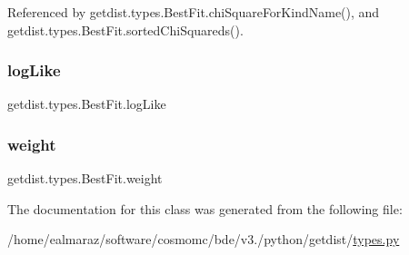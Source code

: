 Referenced by getdist.\+types.\+Best\+Fit.\+chi\+Square\+For\+Kind\+Name(), and getdist.\+types.\+Best\+Fit.\+sorted\+Chi\+Squareds().

\mbox{\label{classgetdist_1_1types_1_1BestFit_a28cc70877c8a1616051400ddbec10e52}} 
\subsubsection{\texorpdfstring{log\+Like}{logLike}}
{\footnotesize\ttfamily getdist.\+types.\+Best\+Fit.\+log\+Like}

\mbox{\label{classgetdist_1_1types_1_1BestFit_a55aeaf0af24610e27b143aa4f959e2ab}} 
\subsubsection{\texorpdfstring{weight}{weight}}
{\footnotesize\ttfamily getdist.\+types.\+Best\+Fit.\+weight}



The documentation for this class was generated from the following file\+:\begin{DoxyCompactItemize}
\item 
/home/ealmaraz/software/cosmomc/bde/v3./python/getdist/\mbox{\hyperlink{types_8py}{types.\+py}}\end{DoxyCompactItemize}
